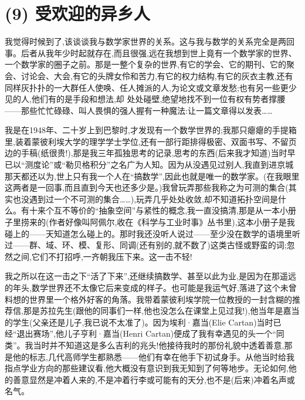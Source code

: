 \section{(9) 受欢迎的异乡人}

我觉得时候到了,该谈谈我与数学家世界的关系。这与我与数学的关系完全是两回事。后者从我年少时起就存在,而且很强,远在我想到世上竟有一个数学家的世界、一个数学家的圈子之前。那是一整个复杂的世界,有它的学会、它的期刊、它的聚会、讨论会、大会,有它的头牌女伶和苦力,有它的权力结构,有它的灰衣主教,还有同样灰扑扑的一大群任人使唤、任人摊派的人,为论文或文章发愁;也有另一些更少见的人,他们有的是手段和想法,却
处处碰壁,绝望地找不到一位有权有势者撑腰——那些忙忙碌碌、叫人畏惧的强人握有一种魔法:让一篇文章得以发表……

 我是在1948年、二十岁上到巴黎时,才发现有一个数学世界的;我那只瘪瘪的手提箱里,装着蒙彼利埃大学的理学学士学位,还有一部行距排得极密、双面书写、不留页边的手稿(纸很贵!),那是我三年孤独思考的记录,思考的东西(后来我才知道)当时早已以“测度论”或“勒贝格积分”之名广为人知。因为从没遇见过别人,我直到进京城那天都还以为,世上只有我一个人在“搞数学”,因此也就是唯一的数学家。(在我眼里这两者是一回事,而且直到今天也还多少是。)我曾玩弄那些我称之为可测的集合(其实也没遇到过一个不可测的集合……),玩弄几乎处处收敛,却不知道拓扑空间是什么。有十来个互不等价的“抽象空间”与紧性的概念,我一直没搞清,那是从一本小册子里捞来的(作者好像叫阿佩尔,收在《科学与工业时事》丛书里),这本小册子是我碰上的——天知道怎么碰上的。那时我还没听人说过——至少没在数学的语境里听过——群、域、环、模、复形、同调(还有别的,就不数了)这类古怪或野蛮的词;忽然之间,它们不打招呼,一齐朝我压下来。这一击不轻!

我之所以在这一击之下“活了下来”,还继续搞数学、甚至以此为业,是因为在那遥远的年头,数学世界还不太像它后来变成的样子。也可能是我运气好,落进了这个未曾料想的世界里一个格外好客的角落。我带着蒙彼利埃学院一位教授的一封含糊的推荐信,那是苏拉先生(跟他的同事们一样,他也没怎么在课堂上见过我!),他当年是嘉当的学生(父亲还是儿子,我已说不太准了)。因为埃利·嘉当(Elie Cartan)当时已经“退出赛场”,他儿子亨利·嘉当(Henri Cartan)便成了我有幸遇见的头一个“同类”。我当时并不知道这是多么吉利的兆头!他接待我时的那份礼貌中透着善意,那是他的标志,几代高师学生都熟悉——他们有幸在他手下初试身手。从他当时给我指点学业方向的那些建议看,他大概没有意识到我无知到了何等地步。无论如何,他的善意显然是冲着人来的,不是冲着行李或可能有的天分,也不是(后来)冲着名声或名气。

